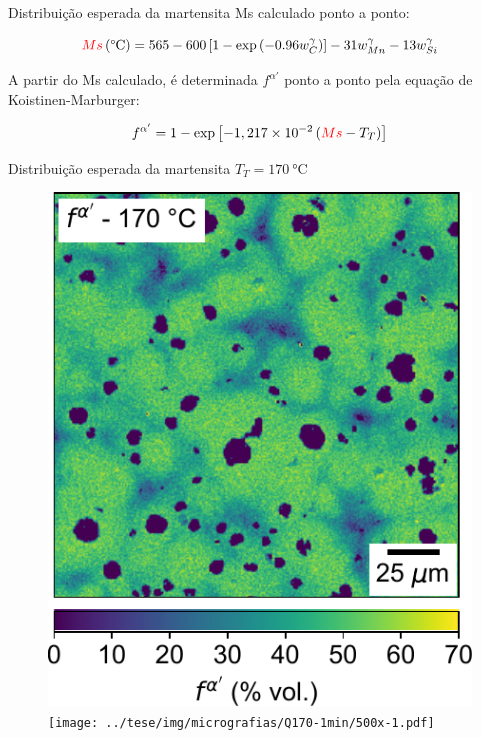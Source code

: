 \begin{frame}{Distribuição esperada da martensita}
  Ms calculado ponto a ponto:

  $$\textcolor{red}{Ms}\,\text{(°C)} = 565 - 600 \left[1 - \exp \left( -0.96 w_C^\gamma \right)\right] - 31 w_{Mn}^\gamma - 13 w_{Si}^\gamma$$

  A partir do Ms calculado, é determinada $f^{\alpha'}$ ponto a ponto pela equação de Koistinen-Marburger:

  $$f^{\alpha'} = 1 - \exp\left[ -1,217 \times 10^{-2} \left( \textcolor{red}{Ms} - T_T \right) \right]$$
\end{frame}

\begin{frame}{Distribuição esperada da martensita}
  $T_T = \SI{170}{\degreeCelsius}$

  \begin{figure}
    \includegraphics[width=.49\textwidth,valign=t]{img/fmart_TQ170.pdf}\hfill
    \texttt{[image: ../tese/img/micrografias/Q170-1min/500x-1.pdf]}
  \end{figure}
\end{frame}

